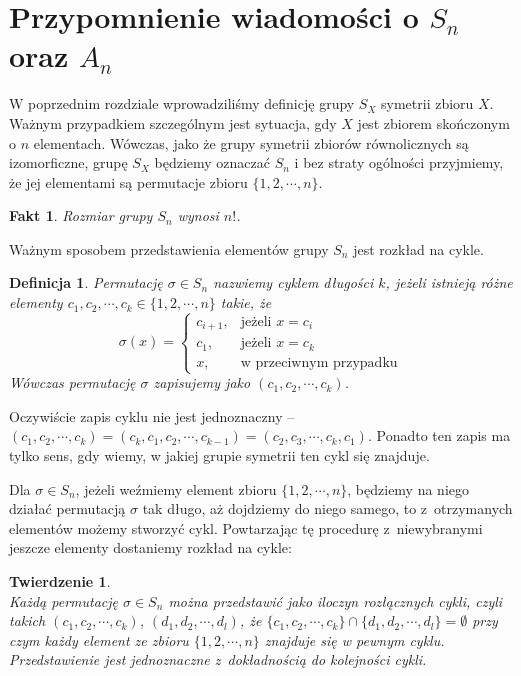 \documentclass[licencjacka]{pracamgr}
\newtheorem{deff}{Definicja}[section]
\newtheorem{thh}{Twierdzenie}[section]
\newtheorem{fact}{Fakt}[section]
\begin{document}
\section{Przypomnienie wiadomości o $S_n$ oraz $A_n$}

W poprzednim rozdziale wprowadziliśmy definicję grupy $S_X$ symetrii zbioru $X$.
Ważnym przypadkiem szczególnym jest sytuacja, gdy $X$ jest zbiorem skończonym o $n$ elementach.
Wówczas, jako że grupy symetrii zbiorów równolicznych są izomorficzne, 
grupę $S_X$ będziemy oznaczać $S_n$ i bez straty ogólności przyjmiemy, że jej elementami są permutacje zbioru $\{1, 2, \cdots, n\}$.

\begin{fact}
	Rozmiar grupy $S_n$ wynosi $n!$.
\end{fact}

Ważnym sposobem przedstawienia elementów grupy $S_n$ jest rozkład na cykle.

\begin{deff}	%
	Permutację $\sigma \in S_n$ nazwiemy \emph{cyklem długości $k$}, 
	jeżeli istnieją różne elementy $c_1, c_2, \cdots, c_k \in \{1, 2, \cdots, n\}$ takie, że
	$$ \sigma(x) = \left\{ 
				\begin{array}{ll}
					c_{i+1}, & \textrm{jeżeli $x = c_i$}\\
					c_1,     & \textrm{jeżeli $x = c_k$}\\
					x,       & \textrm{w przeciwnym przypadku}
				\end{array} \right.
	$$
	Wówczas permutację $\sigma$ zapisujemy jako $(c_1, c_2, \cdots, c_k)$.
\end{deff}

Oczywiście zapis cyklu nie jest jednoznaczny -- $(c_1, c_2, \cdots, c_k) = (c_k, c_1, c_2, \cdots, c_{k-1}) = (c_2, c_3, \cdots, c_k, c_1)$.
Ponadto ten zapis ma tylko sens, gdy wiemy, w jakiej grupie symetrii ten cykl się znajduje.

Dla $\sigma \in S_n$, jeżeli weźmiemy element zbioru $\{1, 2, \cdots, n\}$, będziemy na niego działać permutacją $\sigma$ tak długo, 
aż dojdziemy do niego samego, to z~otrzymanych elementów możemy stworzyć cykl.
Powtarzając tę procedurę z~niewybranymi jeszcze elementy dostaniemy rozkład na cykle:

\begin{thh} $ $ \\		%
	Każdą permutację $\sigma \in S_n$ można przedstawić jako iloczyn rozłącznych cykli, 
	czyli takich $(c_1, c_2, \cdots, c_k)$, $(d_1, d_2, \cdots, d_l)$, że $\{ c_1, c_2, \cdots, c_k \} \cap \{ d_1, d_2, \cdots, d_l \} = \emptyset$
	przy czym każdy element ze zbioru $\{1, 2, \cdots, n\}$ znajduje się w pewnym cyklu.
	Przedstawienie jest jednoznaczne z~dokładnością do kolejności cykli.
\end{thh}
\end{document}
